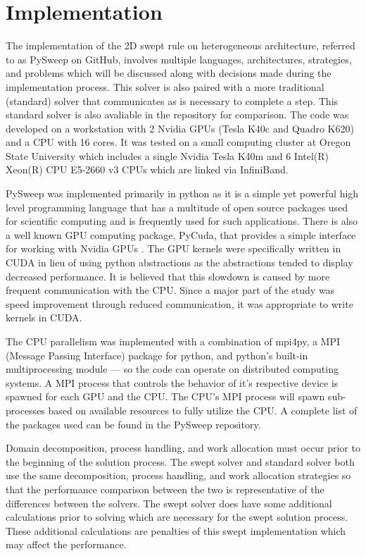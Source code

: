 \documentclass[review]{elsarticle}
\begin{document}
%
%

\section{Implementation}
The implementation of the 2D swept rule on heterogeneous architecture, referred to as PySweep on GitHub, involves multiple languages, architectures, strategies, and problems which will be discussed along with decisions made during the implementation process. This solver is also paired with a more traditional (standard) solver that communicates as is necessary to complete a step. This standard solver is also avaliable in the repository for comparison. The code was developed on a workstation with 2 Nvidia GPUs (Tesla K40c and Quadro K620) and a CPU with 16 cores. It was tested on a small computing cluster at Oregon State University which includes a single Nvidia Tesla K40m and 6 Intel(R) Xeon(R) CPU E5-2660 v3 CPUs which are linked via InfiniBand.

\par
PySweep was implemented primarily in python as it is a simple yet powerful high level programming language that has a multitude of open source packages used for scientific computing and is frequently used for such applications. There is also a well known GPU computing package, PyCuda, that provides a simple interface for working with Nvidia GPUs \cite{KlocknerPyCUDAGeneration}. The GPU kernels were specifically written in CUDA in lieu of using python abstractions as the abstractions tended to display decreased performance. It is believed that this slowdown is caused by more frequent communication with the CPU. Since a major part of the study was speed improvement through reduced communication, it was appropriate to write kernels in CUDA. 

\par
The CPU parallelism was implemented with a combination of mpi4py, a MPI (Message Passing Interface) package for python, and python's built-in multiprocessing module --- so the code can operate on distributed computing systems. A MPI process that controls the behavior of it's respective device is spawned for each GPU and the CPU. The CPU's MPI process will spawn sub-processes based on available resources to fully utilize the CPU. A complete list of the packages used can be found in the PySweep repository.

\par Domain decomposition, process handling, and work allocation must occur prior to the beginning of the solution process. The swept solver and standard solver both use the same decomposition, process handling, and work allocation strategies so that the performance comparison between the two is representative of the differences between the solvers. The swept solver does have some additional calculations prior to solving which are necessary for the swept solution process. These additional calculations are penalties of this swept implementation which may affect the performance. 
\end{document}
